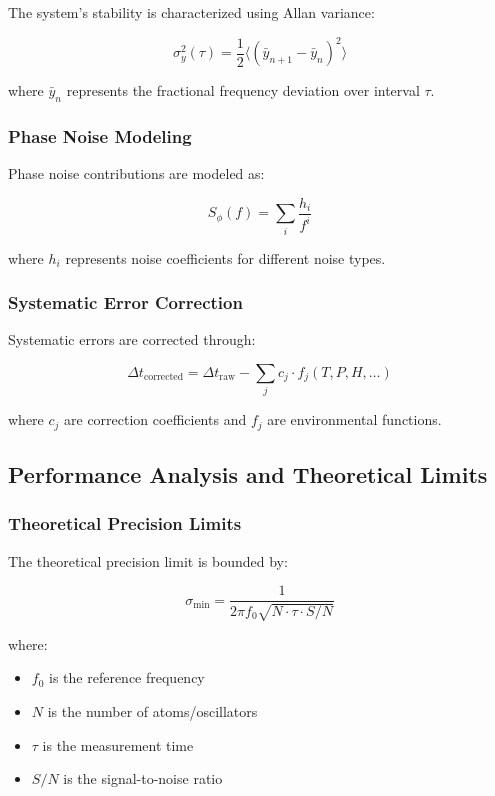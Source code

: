 \documentclass[12pt,a4paper]{article}
\begin{document}
{{{{{{{{{{{{{{The system's stability is characterized using Allan variance:

\begin{equation}
\sigma_y^2(\tau) = \frac{1}{2} \langle (\bar{y}_{n+1} - \bar{y}_n)^2 \rangle
\end{equation}

where $\bar{y}_n$ represents the fractional frequency deviation over interval $\tau$.

\subsubsection{Phase Noise Modeling}

Phase noise contributions are modeled as:

\begin{equation}
S_\phi(f) = \sum_{i} \frac{h_i}{f^i}
\end{equation}

where $h_i$ represents noise coefficients for different noise types.

\subsubsection{Systematic Error Correction}

Systematic errors are corrected through:

\begin{equation}
\Delta t_{\text{corrected}} = \Delta t_{\text{raw}} - \sum_{j} c_j \cdot f_j(T, P, H, \ldots)
\end{equation}

where $c_j$ are correction coefficients and $f_j$ are environmental functions.

\subsection{Performance Analysis and Theoretical Limits}

\subsubsection{Theoretical Precision Limits}

The theoretical precision limit is bounded by:

\begin{equation}
\sigma_{\text{min}} = \frac{1}{2\pi f_0 \sqrt{N \cdot \tau \cdot S/N}}
\end{equation}

where:
\begin{itemize}
\item $f_0$ is the reference frequency
\item $N$ is the number of atoms/oscillators
\item $\tau$ is the measurement time
\item $S/N$ is the signal-to-noise ratio
\end{itemize}

}}}}}}}}}}}}}}
\end{document}
